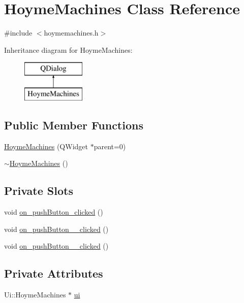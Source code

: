 \hypertarget{classHoymeMachines}{}\section{Hoyme\+Machines Class Reference}
\label{classHoymeMachines}


{\ttfamily \#include $<$hoymemachines.\+h$>$}

Inheritance diagram for Hoyme\+Machines\+:\begin{figure}[H]
\begin{center}
\leavevmode
\includegraphics[height=2.000000cm]{classHoymeMachines}
\end{center}
\end{figure}
\subsection*{Public Member Functions}
\begin{DoxyCompactItemize}
\item 
\hyperlink{classHoymeMachines_af118b420693258a5a4ec10810f02a7ec}{Hoyme\+Machines} (Q\+Widget $\ast$parent=0)
\item 
\hyperlink{classHoymeMachines_a6aa418fc62c58137171e313c1ace4ccf}{$\sim$\+Hoyme\+Machines} ()
\end{DoxyCompactItemize}
\subsection*{Private Slots}
\begin{DoxyCompactItemize}
\item 
void \hyperlink{classHoymeMachines_a34b497f41441b0dd94fc0181798daa92}{on\+\_\+push\+Button\+\_\+clicked} ()
\item 
void \hyperlink{classHoymeMachines_ae6dbb429a5f917a656d34f42de4f32fe}{on\+\_\+push\+Button\+\_\+\_\+clicked} ()
\item 
void \hyperlink{classHoymeMachines_a884d8539f9bdeb71acbe4a7381114f42}{on\+\_\+push\+Button\+\_\+\_\+clicked} ()
\end{DoxyCompactItemize}
\subsection*{Private Attributes}
\begin{DoxyCompactItemize}
\item 
Ui\+::\+Hoyme\+Machines $\ast$ \hyperlink{classHoymeMachines_a72f3067484ba8b1cfa5dbb5e1b7025ba}{ui}
\end{DoxyCompactItemize}


